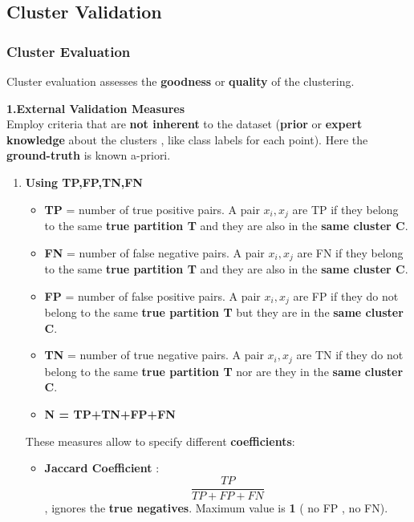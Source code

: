 \subsection{Cluster Validation}
\subsubsection{Cluster Evaluation}
Cluster evaluation assesses the \textbf{goodness} or \textbf{quality} of the clustering.

\begin{description}
\item \textbf{1.External Validation Measures}\\
Employ criteria that are \textbf{not inherent} to the dataset (\textbf{prior} or \textbf{expert knowledge} about the clusters , like class labels for each point). Here the \textbf{ground-truth} is known a-priori.
\begin{enumerate}


\item \textbf{Using TP,FP,TN,FN}\\

\begin{itemize}
\item \textbf{TP} = number of true positive pairs. A pair $x_i,x_j$ are TP if they belong to the same \textbf{true partition T} and they are also in the \textbf{same cluster C}.
\item \textbf{FN} = number of false negative pairs.  A pair $x_i,x_j$ are FN if they belong to the same \textbf{true partition T} and they are also in the \textbf{same cluster C}.
\item \textbf{FP} = number of false positive pairs.  A pair $x_i,x_j$ are FP if they do not belong to the same \textbf{true partition T} but they are in the \textbf{same cluster C}.
\item \textbf{TN} = number of true negative pairs.  A pair $x_i,x_j$ are TN if they do not  belong to the same \textbf{true partition T} nor are they  in the \textbf{same cluster C}.
\item \textbf{N = TP+TN+FP+FN}
\end{itemize}

These measures allow to specify different \textbf{coefficients}:
\begin{itemize}

\item \textbf{Jaccard Coefficient} :  
$$\frac{TP}{TP+FP+FN}$$ , ignores the \textbf{true negatives}. Maximum value is \textbf{1} ( no FP , no FN).


\end{itemize}
\end{enumerate}
\end{description}
